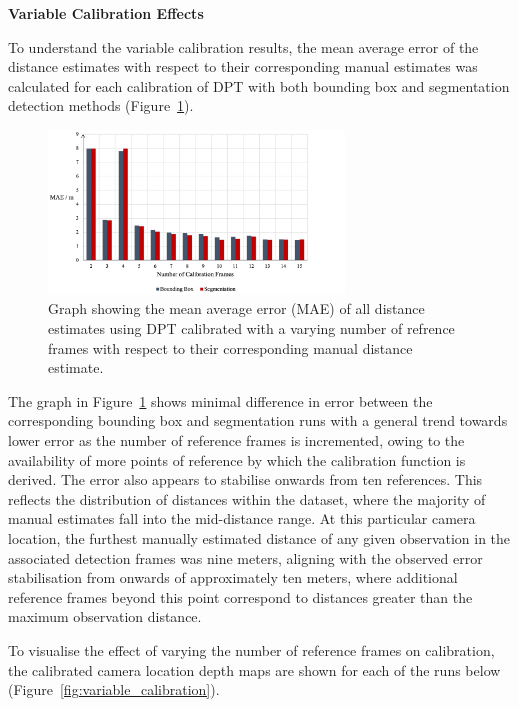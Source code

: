 \vspace{5mm}
\textbf{Variable Calibration Effects}

To understand the variable calibration results, the mean average error of the distance estimates
with respect to their corresponding manual estimates was calculated for each calibration
of DPT with both bounding box and segmentation detection methods (Figure~\ref{fig:MAE_var_cal}).

\begin{figure}[H]
    \centering
    \includegraphics[width=0.7\textwidth]{body/analysis/assets/calibration_effects/MAE_var_cal}
    \caption{Graph showing the mean average error (MAE) of all distance estimates using DPT calibrated
        with a varying number of refrence frames with respect to their corresponding manual distance
        estimate.}
    \label{fig:MAE_var_cal}
\end{figure}

The graph in Figure~\ref{fig:MAE_var_cal} shows minimal difference in error between the corresponding
bounding box and segmentation runs with a general trend towards lower error as the number of reference
frames is incremented, owing to the availability of more points of reference by which the calibration
function is derived.
The error also appears to stabilise onwards from ten references.
This reflects the distribution of distances within the dataset, where the majority of
manual estimates fall into the mid-distance range.
At this particular camera location, the furthest manually estimated distance of any given
observation in the associated detection frames was nine meters, aligning with the observed error
stabilisation from onwards of approximately ten meters, where additional reference frames beyond this
point correspond to distances greater than the maximum observation distance.

To visualise the effect of varying the number of reference frames on calibration, the calibrated
camera location depth maps are shown for each of the runs below (Figure~\ref{fig:variable_calibration}).

